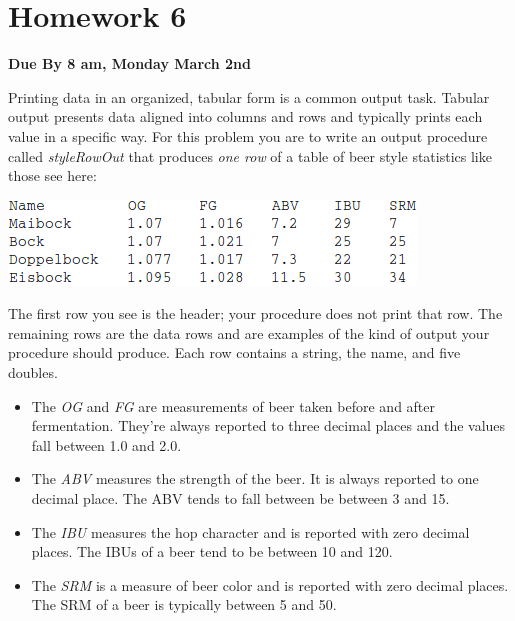 \documentclass[nobib]{tufte-handout}
\begin{document}
\newpage

\section{Homework 6}

\begin{center}
\textbf{Due By 8 am, Monday March 2nd}
\end{center}

Printing data in an organized, tabular form is a common output task.  Tabular output presents data aligned into columns and rows and typically prints each value in a specific way.  For this problem you are to write an output procedure called \textit{styleRowOut} that produces \textit{one row} of a table of beer style statistics like those see here:

\vspace{.1in}
\begin{center}
\includegraphics[scale=.5]{tabExample.png}
\end{center}
\vspace{.1in}

The first row you see is the header; your procedure does not print that row. The remaining rows are the data rows and are examples of the kind of output your procedure should produce. Each row contains a string, the name, and five doubles.
\begin{itemize}
\item  The \textit{OG} and \textit{FG} are measurements of beer taken before and after fermentation. They're always reported to three decimal places and the values fall between 1.0 and 2.0. 
\item The \textit{ABV} measures the strength of the beer. It is always reported to one decimal place. The ABV tends to fall between be between 3 and 15.
\item The \textit{IBU} measures the hop character and is reported with zero decimal places. The IBUs of a beer tend to be between 10 and 120.
\item The \textit{SRM} is a measure of beer color and is reported with zero decimal places. The SRM of a beer is typically between 5 and 50. 
\end{itemize}
\end{document}
